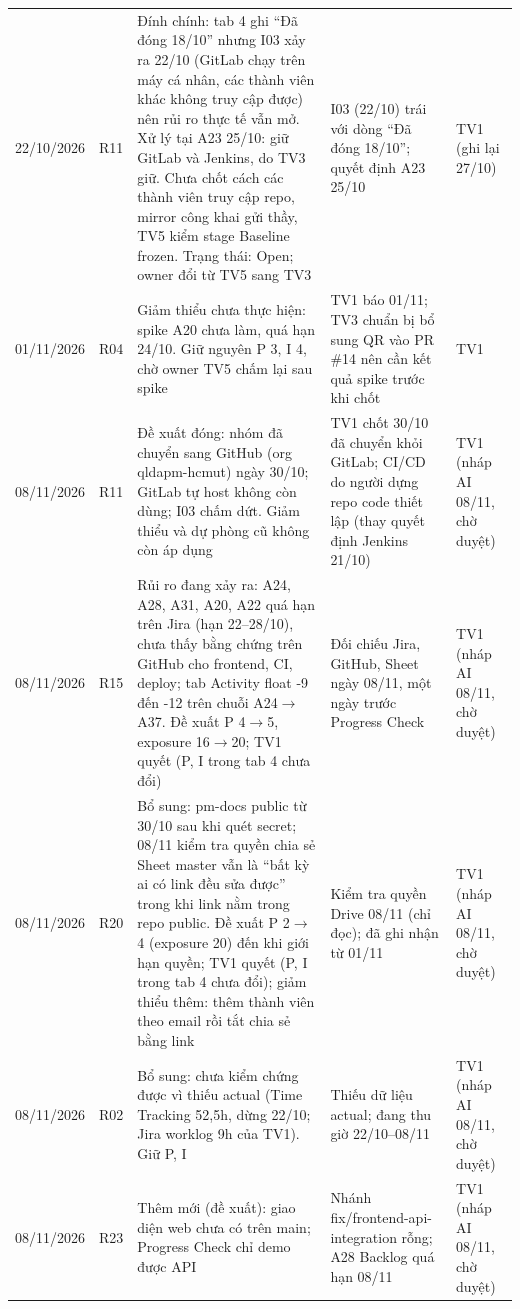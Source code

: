 \begin{landscape}
\begin{longtable}{L{2.82cm}L{1.13cm}L{7.77cm}L{6.07cm}L{2.11cm}}
22/10/2026 & R11 & Đính chính: tab 4 ghi \enquote{Đã đóng 18/10} nhưng I03 xảy ra 22/10 (GitLab chạy trên máy cá nhân, các thành viên khác không truy cập được) nên rủi ro thực tế vẫn mở. Xử lý tại A23 25/10: giữ GitLab và Jenkins, do TV3 giữ. Chưa chốt cách các thành viên truy cập repo, mirror công khai gửi thầy, TV5 kiểm stage Baseline frozen. Trạng thái: Open; owner đổi từ TV5 sang TV3 & I03 (22/10) trái với dòng \enquote{Đã đóng 18/10}; quyết định A23 25/10 & TV1 (ghi lại 27/10) \\
01/11/2026 & R04 & Giảm thiểu chưa thực hiện: spike A20 chưa làm, quá hạn 24/10. Giữ nguyên P 3, I 4, chờ owner TV5 chấm lại sau spike & TV1 báo 01/11; TV3 chuẩn bị bổ sung QR vào PR \#14 nên cần kết quả spike trước khi chốt & TV1 \\
08/11/2026 & R11 & Đề xuất đóng: nhóm đã chuyển sang GitHub (org qldapm-hcmut) ngày 30/10; GitLab tự host không còn dùng; I03 chấm dứt. Giảm thiểu và dự phòng cũ không còn áp dụng & TV1 chốt 30/10 đã chuyển khỏi GitLab; CI/CD do người dựng repo code thiết lập (thay quyết định Jenkins 21/10) & TV1 (nháp AI 08/11, chờ duyệt) \\
08/11/2026 & R15 & Rủi ro đang xảy ra: A24, A28, A31, A20, A22 quá hạn trên Jira (hạn 22–28/10), chưa thấy bằng chứng trên GitHub cho frontend, CI, deploy; tab Activity float -9 đến -12 trên chuỗi A24$\rightarrow$A37. Đề xuất P 4$\rightarrow$5, exposure 16$\rightarrow$20; TV1 quyết (P, I trong tab 4 chưa đổi) & Đối chiếu Jira, GitHub, Sheet ngày 08/11, một ngày trước Progress Check & TV1 (nháp AI 08/11, chờ duyệt) \\
08/11/2026 & R20 & Bổ sung: pm-docs public từ 30/10 sau khi quét secret; 08/11 kiểm tra quyền chia sẻ Sheet master vẫn là \enquote{bất kỳ ai có link đều sửa được} trong khi link nằm trong repo public. Đề xuất P 2$\rightarrow$4 (exposure 20) đến khi giới hạn quyền; TV1 quyết (P, I trong tab 4 chưa đổi); giảm thiểu thêm: thêm thành viên theo email rồi tắt chia sẻ bằng link & Kiểm tra quyền Drive 08/11 (chỉ đọc); đã ghi nhận từ 01/11 & TV1 (nháp AI 08/11, chờ duyệt) \\
08/11/2026 & R02 & Bổ sung: chưa kiểm chứng được vì thiếu actual (Time Tracking 52,5h, dừng 22/10; Jira worklog 9h của TV1). Giữ P, I & Thiếu dữ liệu actual; đang thu giờ 22/10–08/11 & TV1 (nháp AI 08/11, chờ duyệt) \\
08/11/2026 & R23 & Thêm mới (đề xuất): giao diện web chưa có trên main; Progress Check chỉ demo được API & Nhánh fix/\allowbreak frontend-api-integration rỗng; A28 Backlog quá hạn 08/11 & TV1 (nháp AI 08/11, chờ duyệt) \\

\end{longtable}
\end{landscape}
